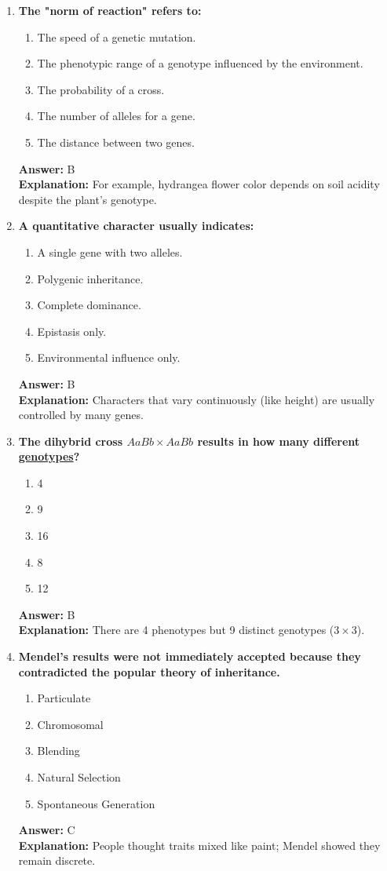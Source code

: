 \documentclass[11pt, a4paper]{article}
\begin{document}
\begin{enumerate}[leftmargin=*, label=\arabic*.]
\item \textbf{The "norm of reaction" refers to:}
\begin{enumerate}[label=\Alph*.]
\item The speed of a genetic mutation.
\item The phenotypic range of a genotype influenced by the environment.
\item The probability of a cross.
\item The number of alleles for a gene.
\item The distance between two genes.
\end{enumerate}
\textbf{Answer:} B \\
\textbf{Explanation:} For example, hydrangea flower color depends on soil acidity despite the plant's genotype.

\item \textbf{A quantitative character usually indicates:}
\begin{enumerate}[label=\Alph*.]
\item A single gene with two alleles.
\item Polygenic inheritance.
\item Complete dominance.
\item Epistasis only.
\item Environmental influence only.
\end{enumerate}
\textbf{Answer:} B \\
\textbf{Explanation:} Characters that vary continuously (like height) are usually controlled by many genes.

\item \textbf{The dihybrid cross $AaBb \times AaBb$ results in how many different \underline{genotypes}?}
\begin{enumerate}[label=\Alph*.]
\item 4
\item 9
\item 16
\item 8
\item 12
\end{enumerate}
\textbf{Answer:} B \\
\textbf{Explanation:} There are 4 phenotypes but 9 distinct genotypes ($3 \times 3$).

\item \textbf{Mendel’s results were not immediately accepted because they contradicted the popular \underline{\hspace{1cm}} theory of inheritance.}
\begin{enumerate}[label=\Alph*.]
\item Particulate
\item Chromosomal
\item Blending
\item Natural Selection
\item Spontaneous Generation
\end{enumerate}
\textbf{Answer:} C \\
\textbf{Explanation:} People thought traits mixed like paint; Mendel showed they remain discrete.


\end{enumerate}
\end{document}
